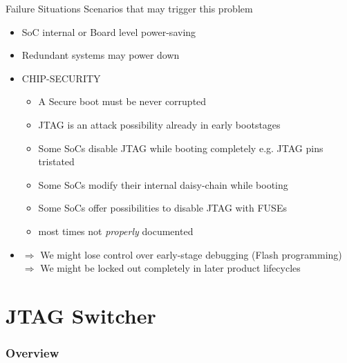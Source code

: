\documentclass[aspectratio=169,12pt]{beamer}
\begin{document}
\begin{frame}{Failure Situations}
Scenarios that may trigger this problem
\begin{itemize}
\item SoC internal or Board level power-saving
\item Redundant systems may power down
\item CHIP-SECURITY
\begin{itemize}
\item A Secure boot must be never corrupted
\item JTAG is an attack possibility already in early bootstages
\item Some SoCs disable JTAG while booting completely e.g. JTAG pins tristated
\item Some SoCs modify their internal daisy-chain while booting
\item Some SoCs offer possibilities to disable JTAG with FUSEs
\item most times not \emph{properly} documented
\end{itemize}
\item $\Rightarrow$ We might lose control over early-stage debugging (Flash programming)\\
      $\Rightarrow$ We might be locked out completely in later product lifecycles

\end{itemize}
\end{frame}

\section{JTAG Switcher}
\begin{frame}
\frametitle{Overview}
\end{frame}
\end{document}

